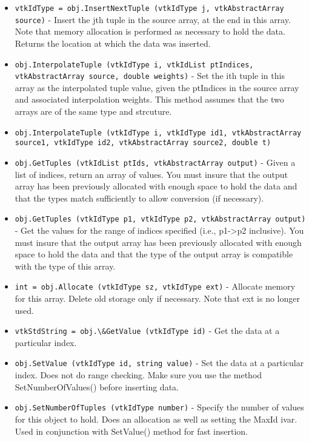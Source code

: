 \begin{itemize}
\item  \verb|vtkIdType = obj.InsertNextTuple (vtkIdType j, vtkAbstractArray source)| -  Insert the jth tuple in the source array, at the end in this array. 
 Note that memory allocation is performed as necessary to hold the data.
 Returns the location at which the data was inserted.

\item  \verb|obj.InterpolateTuple (vtkIdType i, vtkIdList ptIndices, vtkAbstractArray source, double weights)| -  Set the ith tuple in this array as the interpolated tuple value,
 given the ptIndices in the source array and associated 
 interpolation weights.
 This method assumes that the two arrays are of the same type
 and strcuture.

\item  \verb|obj.InterpolateTuple (vtkIdType i, vtkIdType id1, vtkAbstractArray source1, vtkIdType id2, vtkAbstractArray source2, double t)|

\item  \verb|obj.GetTuples (vtkIdList ptIds, vtkAbstractArray output)| -  Given a list of indices, return an array of values.  You must
 insure that the output array has been previously allocated with
 enough space to hold the data and that the types match
 sufficiently to allow conversion (if necessary).

\item  \verb|obj.GetTuples (vtkIdType p1, vtkIdType p2, vtkAbstractArray output)| -  Get the values for the range of indices specified (i.e.,
 p1->p2 inclusive). You must insure that the output array has been
 previously allocated with enough space to hold the data and that
 the type of the output array is compatible with the type of this
 array.

\item  \verb|int = obj.Allocate (vtkIdType sz, vtkIdType ext)| -  Allocate memory for this array. Delete old storage only if necessary.
 Note that ext is no longer used.

\item  \verb|vtkStdString = obj.\&GetValue (vtkIdType id)| -  Get the data at a particular index.

\item  \verb|obj.SetValue (vtkIdType id, string value)| -  Set the data at a particular index. Does not do range checking. Make sure
 you use the method SetNumberOfValues() before inserting data.

\item  \verb|obj.SetNumberOfTuples (vtkIdType number)| -  Specify the number of values for this object to hold. Does an
 allocation as well as setting the MaxId ivar. Used in conjunction with
 SetValue() method for fast insertion.


\end{itemize}
